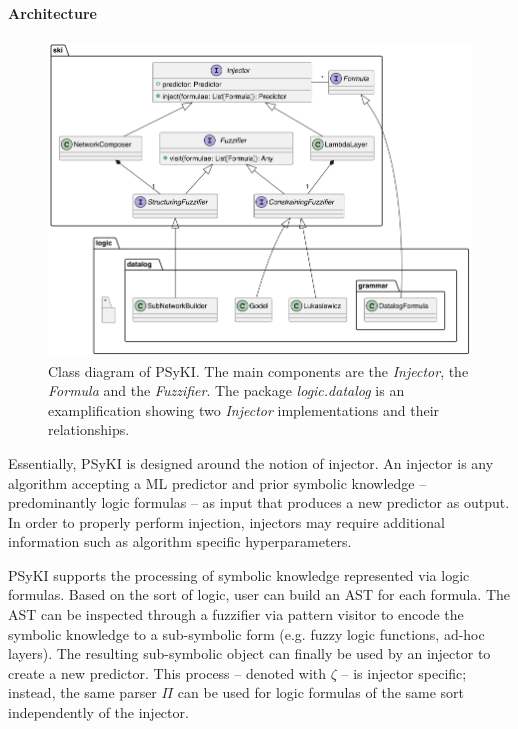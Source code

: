 \paragraph{Architecture}\label{par:architecture}
%
\begin{figure}
    \centering
    \includegraphics[width=\textwidth]{figures/class-diagram}
    \caption[Class diagram of PSyKI]{
        Class diagram of \Gls{PSyKI}.
        The main components are the \emph{Injector}, the \emph{Formula} and the \emph{Fuzzifier}.
        The package \emph{logic.datalog} is an examplification showing two \emph{Injector} implementations and their relationships.
    }
    \label{fig:psyki-class-diagram}
\end{figure}
%
Essentially, \gls{PSyKI} is designed around the notion of injector.
%
An injector is any algorithm accepting a \gls{ML} predictor and prior symbolic knowledge -- predominantly logic formulas -- as input that produces a new predictor as output.
%
In order to properly perform injection, injectors may require additional information such as algorithm specific hyperparameters.


\gls{PSyKI} supports the processing of symbolic knowledge represented via logic formulas.
%
Based on the sort of logic, user can build an \gls{AST} for each formula.
%
The \gls{AST} can be inspected through a fuzzifier via pattern visitor to encode the symbolic knowledge to a sub-symbolic form (e.g. fuzzy logic functions, ad-hoc layers).
%
The resulting sub-symbolic object can finally be used by an injector to create a new predictor.
%
This process -- denoted with $\zeta$  -- is injector specific; instead, the same parser $\Pi$ can be used for logic formulas of the same sort independently of the injector.



